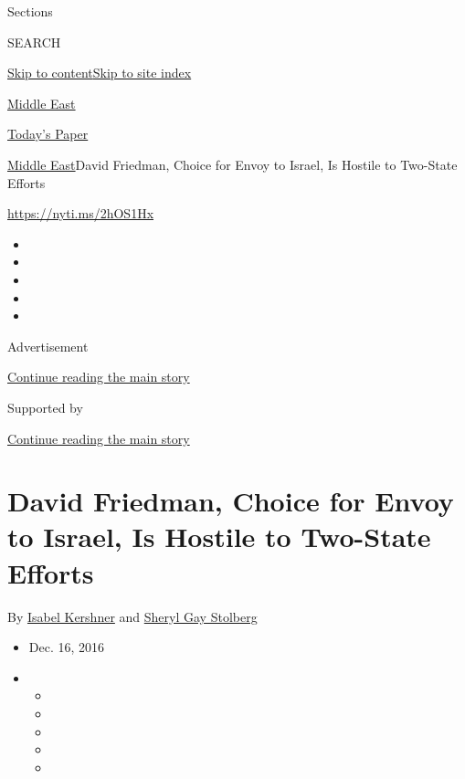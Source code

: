 Sections

SEARCH

\protect\hyperlink{site-content}{Skip to
content}\protect\hyperlink{site-index}{Skip to site index}

\href{https://www.nytimes3xbfgragh.onion/section/world/middleeast}{Middle
East}

\href{https://myaccount.nytimes3xbfgragh.onion/auth/login?response_type=cookie\&client_id=vi}{}

\href{https://www.nytimes3xbfgragh.onion/section/todayspaper}{Today's
Paper}

\href{/section/world/middleeast}{Middle East}\textbar{}David Friedman,
Choice for Envoy to Israel, Is Hostile to Two-State Efforts

\url{https://nyti.ms/2hOS1Hx}

\begin{itemize}
\item
\item
\item
\item
\item
\end{itemize}

Advertisement

\protect\hyperlink{after-top}{Continue reading the main story}

Supported by

\protect\hyperlink{after-sponsor}{Continue reading the main story}

\hypertarget{david-friedman-choice-for-envoy-to-israel-is-hostile-to-two-state-efforts}{%
\section{David Friedman, Choice for Envoy to Israel, Is Hostile to
Two-State
Efforts}\label{david-friedman-choice-for-envoy-to-israel-is-hostile-to-two-state-efforts}}

By \href{https://www.nytimes3xbfgragh.onion/by/isabel-kershner}{Isabel
Kershner} and
\href{http://www.nytimes3xbfgragh.onion/by/sheryl-gay-stolberg}{Sheryl
Gay Stolberg}

\begin{itemize}
\item
  Dec. 16, 2016
\item
  \begin{itemize}
  \item
  \item
  \item
  \item
  \item
  \end{itemize}
\end{itemize}

